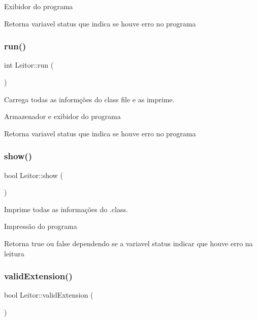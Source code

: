 Exibidor do programa \begin{DoxyReturn}{Retorna}
variavel status que indica se houve erro no programa 
\end{DoxyReturn}
\mbox{\label{classLeitor_a82a5ba05f6445e0c56f15eddecef21a3}} 
\subsubsection{\texorpdfstring{run()}{run()}}
{\footnotesize\ttfamily int Leitor\+::run (\begin{DoxyParamCaption}{ }\end{DoxyParamCaption})}



Carrega todas as informções do class file e as imprime. 

Armazenador e exibidor do programa \begin{DoxyReturn}{Retorna}
variavel status que indica se houve erro no programa 
\end{DoxyReturn}
\mbox{\label{classLeitor_a1f50a340fba40d773af019975a3ab385}} 
\subsubsection{\texorpdfstring{show()}{show()}}
{\footnotesize\ttfamily bool Leitor\+::show (\begin{DoxyParamCaption}{ }\end{DoxyParamCaption})}



Imprime todas as informações do .class. 

Impressão do programa \begin{DoxyReturn}{Retorna}
true ou false dependendo se a variavel status indicar que houve erro na leitura 
\end{DoxyReturn}
\mbox{\label{classLeitor_a64ccb4aca8b2c665b79ace09a3423b77}} 
\subsubsection{\texorpdfstring{valid\+Extension()}{validExtension()}}
{\footnotesize\ttfamily bool Leitor\+::valid\+Extension (\begin{DoxyParamCaption}{ }\end{DoxyParamCaption})}



